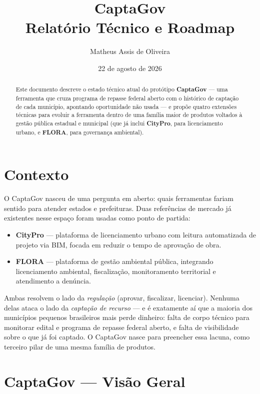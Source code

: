 \documentclass[11pt,a4paper]{article}
\title{\textbf{\color{captagov}CaptaGov}\\[0.3em]\Large Relatório Técnico e Roadmap}
\author{Matheus Assis de Oliveira}
\date{22 de agosto de 2026}
\begin{document}
\maketitle
\thispagestyle{fancy}

\begin{abstract}
\noindent Este documento descreve o estado técnico atual do protótipo \textbf{CaptaGov} --- uma
ferramenta que cruza programa de repasse federal aberto com o histórico de captação de cada
município, apontando oportunidade não usada --- e propõe quatro extensões técnicas para
evoluir a ferramenta dentro de uma família maior de produtos voltados à gestão pública
estadual e municipal (que já inclui \textbf{CityPro}, para licenciamento urbano, e
\textbf{FLORA}, para governança ambiental).
\end{abstract}

\section{Contexto}

O CaptaGov nasceu de uma pergunta em aberto: quais ferramentas fariam sentido para atender
estados e prefeituras. Duas referências de mercado já existentes nesse espaço foram
usadas como ponto de partida:

\begin{itemize}
  \item \textbf{CityPro} --- plataforma de licenciamento urbano com leitura automatizada de
    projeto via BIM, focada em reduzir o tempo de aprovação de obra.
  \item \textbf{FLORA} --- plataforma de gestão ambiental pública, integrando licenciamento
    ambiental, fiscalização, monitoramento territorial e atendimento a denúncia.
\end{itemize}

Ambas resolvem o lado da \emph{regulação} (aprovar, fiscalizar, licenciar). Nenhuma delas
ataca o lado da \emph{captação de recurso} --- e é exatamente aí que a maioria dos municípios
pequenos brasileiros mais perde dinheiro: falta de corpo técnico para monitorar edital e
programa de repasse federal aberto, e falta de visibilidade sobre o que já foi captado. O
CaptaGov nasce para preencher essa lacuna, como terceiro pilar de uma mesma família de
produtos.

\section{CaptaGov --- Visão Geral}
\end{document}
